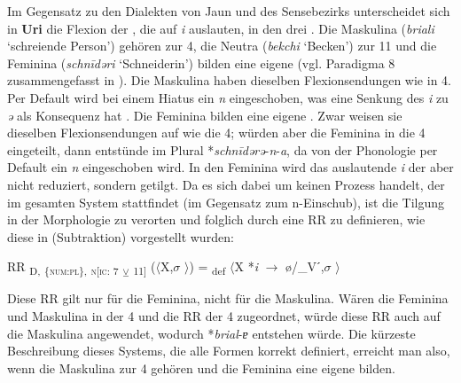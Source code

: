 Im Gegensatz zu den Dialekten von Jaun und des Sensebezirks unterscheidet sich in \textbf{Uri} die Flexion der , die auf \textit{i} auslauten, in den drei . Die Maskulina (\textit{briali} ‘schreiende Person’) gehören zur  4, die Neutra (\textit{bekchi} ‘Becken’) zur  11 und die Feminina (\textit{schn\=idəri} ‘Schneiderin’) bilden eine eigene   (vgl. Paradigma 8 zusammengefasst in ). Die Maskulina haben dieselben Flexionsendungen wie in  4. Per Default wird bei einem Hiatus ein \textit{n} eingeschoben, was eine Senkung des \textit{i} zu \textit{ə} als Konsequenz hat \citep[106]{Clauß1929}. Die Feminina bilden eine eigene . Zwar weisen sie dieselben Flexionsendungen auf wie die  4; würden aber die Feminina in die  4 eingeteilt, dann entstünde im Plural *\textit{schn\=idərə}-\textit{n}-\textit{a}, da von der Phonologie per Default ein \textit{n} eingeschoben wird. In den Feminina wird das auslautende \textit{i} der  aber nicht reduziert, sondern getilgt. Da es sich dabei um keinen Prozess handelt, der im gesamten System stattfindet (im Gegensatz zum n-Einschub), ist die Tilgung in der Morphologie zu verorten und folglich durch eine RR zu definieren, wie diese in  (Subtraktion) vorgestellt wurden:

\ea%
\label{ex:key:61}
 RR \textsubscript{D,} \textsubscript{\{\textsc{num:pl}\},} \textsubscript{\textsc{n[}\textsc{ic:} 7} \textsubscript{\tiny $\veebar$}\textsubscript{ 11]} ($\langle$X,$\sigma$ $\rangle$) = \textsubscript{def} $\langle$X *\textit{i} $\rightarrow$ ø/\_Vˊ,$\sigma$ $\rangle$\\
\z

Diese RR gilt nur für die Feminina, nicht für die Maskulina. Wären die Feminina und Maskulina in der  4 und die RR  der  4 zugeordnet, würde diese RR auch auf die Maskulina angewendet, wodurch *\textit{brial}-\textit{ɐ} entstehen würde. Die kürzeste Beschreibung dieses Systems, die alle Formen korrekt definiert, erreicht man also, wenn die Maskulina zur  4 gehören und die Feminina eine eigene  bilden.


